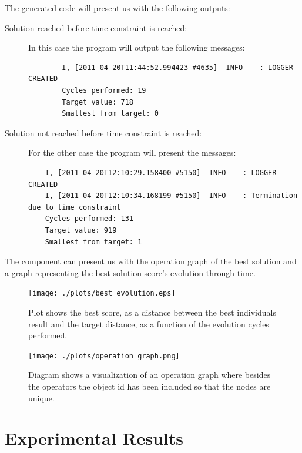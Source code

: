 \documentclass[a4paper,10pt,titlepage]{article}
\begin{document}
\par The generated code will present us with the following outputs:
\begin{description}
	\item[Solution reached before time constraint is reached:] In this case the program will output the following messages:
		{\footnotesize\begin{verbatim}
		I, [2011-04-20T11:44:52.994423 #4635]  INFO -- : LOGGER CREATED
		Cycles performed: 19 
		Target value: 718
		Smallest from target: 0
		\end{verbatim}}
	\item[Solution not reached before time constraint is reached:] For the other case the program will present the messages:
	{\footnotesize\begin{verbatim}
	I, [2011-04-20T12:10:29.158400 #5150]  INFO -- : LOGGER CREATED
	I, [2011-04-20T12:10:34.168199 #5150]  INFO -- : Termination due to time constraint
	Cycles performed: 131 
	Target value: 919
	Smallest from target: 1
	\end{verbatim}}
\end{description}

\par The component can present us with the operation graph of the best solution and a graph representing the best solution score's evolution through time.

\par \begin{figure}[H]
	\centerline{%
	\texttt{[image: ./plots/best\_evolution.eps]}
	}
	\caption[Sequence number resolution: Best score evolution through time]{Plot shows the best score, as a distance between the best individuals result and the target distance, as a function of the evolution cycles performed.}
\end{figure}

\par \begin{figure}[H]
	\centerline{%
	\texttt{[image: ./plots/operation\_graph.png]}
	}
	\caption[Sequence number resolution: Sample operation graph visualization]{Diagram shows a visualization of an operation graph where besides the operators the object id has been included so that the nodes are unique.}
\end{figure}


\section{Experimental Results}
\end{document}
